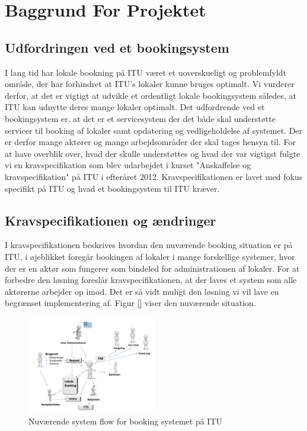 \chapter{Baggrund For Projektet}
\label{Background}
\section{Udfordringen ved et bookingsystem}
\label{Baggrund_Udfording}
I lang tid har lokale bookning på ITU været et uoverskueligt og problemfyldt område, der har forhindret at ITU's lokaler kunne bruges optimalt. Vi vurderer derfor, at det er vigtigt at udvikle et ordentligt lokale bookingsystem således, at ITU kan udnytte deres mange lokaler optimalt. Det udfordrende ved et bookingsystem er, at det er et servicesystem der det både skal understøtte servicer til booking af lokaler samt opdatering og vedligeholdelse af systemet. Der er derfor mange aktører og mange arbejdsområder der skal tages hensyn til. For at have overblik over, hvad der skulle understøttes og hvad der var vigtigst fulgte vi en kravspecifikation som blev udarbejdet i kurset "Anskaffelse og kravspecifikation" på ITU i efteråret 2012. Kravspecifikationen er lavet med fokus specifikt på ITU og hvad et bookingsystem til ITU kræver.
\section{Kravspecifikationen og ændringer}
\label{Baggrund_kravspecifikationen}
I kravspecifikationen beskrives hvordan den nuværende booking situation er på ITU, i øjeblikket foregår bookingen af lokaler i mange forskellige systemer, hvor der er en aktør som fungerer som bindeled for administrationen af lokaler. For at forbedre den løsning foreslår kravspecifikationen, at der laves et system som alle aktørerne arbejder op imod. Det er så vidt muligt den løsning vi vil lave en begrænset implementering af. Figur \ref{} viser den nuværende situation.

\begin{figure}[h!]
  \centering
    \includegraphics[width=0.5\textwidth]{Appendix/GUI-Prototype/NuvaerendeFlow}
  \caption{Nuværende system flow for booking systemet på ITU}
\label{Baggrund_kravspecifikationen_NuvaerendeFlow}
\end{figure}

